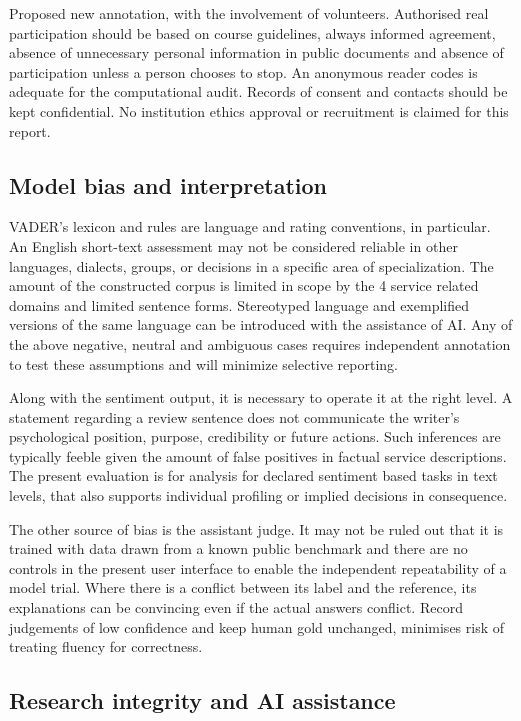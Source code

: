 \documentclass[11pt]{article}
\begin{document}
Proposed new annotation, with the involvement of volunteers. Authorised real participation should be based on course guidelines, always informed agreement, absence of unnecessary personal information in public documents and absence of participation unless a person chooses to stop. An anonymous reader codes is adequate for the computational audit. Records of consent and contacts should be kept confidential. No institution ethics approval or recruitment is claimed for this report.


\subsection{Model bias and interpretation}

VADER's lexicon and rules are language and rating conventions, in particular. An English short-text assessment may not be considered reliable in other languages, dialects, groups, or decisions in a specific area of specialization. The amount of the constructed corpus is limited in scope by the 4 service related domains and limited sentence forms. Stereotyped language and exemplified versions of the same language can be introduced with the assistance of AI. Any of the above negative, neutral and ambiguous cases requires independent annotation to test these assumptions and will minimize selective reporting.


Along with the sentiment output, it is necessary to operate it at the right level. A statement regarding a review sentence does not communicate the writer's psychological position, purpose, credibility or future actions. Such inferences are typically feeble given the amount of false positives in factual service descriptions. The present evaluation is for analysis for declared sentiment based tasks in text levels, that also supports individual profiling or implied decisions in consequence.


The other source of bias is the assistant judge. It may not be ruled out that it is trained with data drawn from a known public benchmark and there are no controls in the present user interface to enable the independent repeatability of a model trial. Where there is a conflict between its label and the reference, its explanations can be convincing even if the actual answers conflict. Record judgements of low confidence and keep human gold unchanged, minimises risk of treating fluency for correctness.


\subsection{Research integrity and AI assistance}
\end{document}

